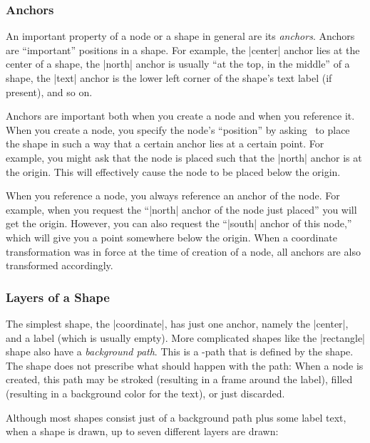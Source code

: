\subsubsection{Anchors}

An important property of a node or a shape in general are its
\emph{anchors}. Anchors are ``important'' positions in a shape. For
example, the |center| anchor lies at the center of a shape, the
|north| anchor is usually ``at the top, in the middle'' of a shape,
the |text| anchor is the lower left corner of the shape's text label
(if present), and so on.

Anchors are important both when you create a node and when you
reference it. When you create a node, you specify the node's
``position'' by asking \pgfname\ to place the shape in such a way that
a certain anchor lies at a certain point. For example, you might ask
that the node is placed such that the |north| anchor is at the
origin. This will effectively cause the node to be placed below the
origin.

When you reference a node, you always reference an anchor of the
node. For example, when you request the ``|north| anchor of the node
just placed'' you will get the origin. However, you can also request
the ``|south| anchor of this node,'' which will give you a point
somewhere below the origin. When a coordinate transformation was in
force at the time of creation of a node, all anchors are also
transformed accordingly.

\subsubsection{Layers of a Shape}

The simplest shape, the |coordinate|, has just one anchor, namely the
|center|, and a label (which is usually empty). More complicated
shapes like the |rectangle| shape also have a \emph{background
  path}. This is a \pgfname-path that is defined by the shape. The
shape does not prescribe what should happen with the path: When a node
is created, this path may be stroked (resulting in a frame around the
label), filled (resulting in a background color for the text), or just
discarded.

Although most shapes consist just of a background path plus some label
text, when a shape is drawn, up to seven different layers are drawn:

